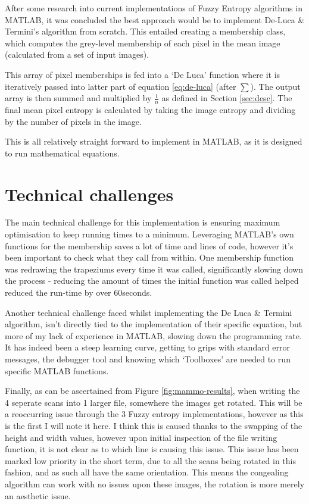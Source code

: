 \documentclass[11pt,fleqn,twoside]{article}
\begin{document}
After some research into current implementations of Fuzzy Entropy algorithms in MATLAB, it was concluded the best approach would be to implement De-Luca \& Termini's algorithm from scratch. This entailed creating a membership class, which computes the grey-level membership of each pixel in the mean image (calculated from a set of input images).

This array of pixel memberships is fed into a `De Luca' function where it is iteratively passed into latter part of equation \ref{eq:de-luca} (after $\displaystyle\sum$). The output array is then summed and multiplied by $\frac{1}{n}$ as defined in Section \ref{sec:desc}. The final mean pixel entropy is calculated by taking the image entropy and dividing by the number of pixels in the image.

This is all relatively straight forward to implement in MATLAB, as it is designed to run mathematical equations.


\section{Technical challenges}

The main technical challenge for this implementation is ensuring maximum optimisation to keep running times to a minimum. Leveraging MATLAB's own functions for the membership saves a lot of time and lines of code, however it's been important to check what they call from within. One membership function was redrawing the trapeziums every time it was called, significantly slowing down the process - reducing the amount of times the initial function was called helped reduced the run-time by over 60seconds.

Another technical challenge faced whilst implementing the De Luca \& Termini algorithm, isn't directly tied to the implementation of their specific equation, but more of my lack of experience in MATLAB, slowing down the programming rate. It has indeed been a steep learning curve, getting to grips with standard error messages, the debugger tool and knowing which `Toolboxes' are needed to run specific MATLAB functions.

Finally, as can be ascertained from Figure \ref{fig:mammo-results}, when writing the 4 seperate scans into 1 larger file, somewhere the images get rotated. This will be a reoccurring issue through the 3 Fuzzy entropy implementations, however as this is the first I will note it here. I think this is caused thanks to the swapping of the height and width values, however upon initial inspection of the file writing function, it is not clear as to which line is causing this issue. This issue has been marked low priority in the short term, due to all the scans being rotated in this fashion, and as such all have the same orientation. This means the congealing algorithm can work with no issues upon these images, the rotation is more merely an aesthetic issue.
\end{document}
